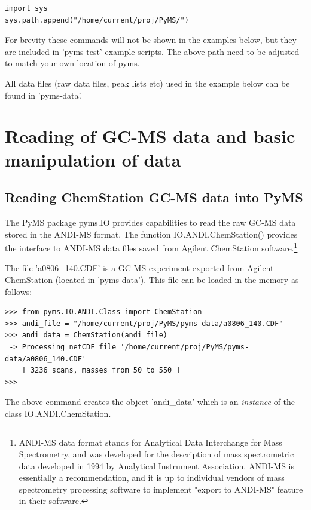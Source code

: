 \begin{verbatim}
import sys
sys.path.append("/home/current/proj/PyMS/")
\end{verbatim}

For brevity these commands will not be shown in the examples below, but
they are included in 'pyms-test' example scripts.  The above path need
to be adjusted to match your own location of pyms.

All data files (raw data files, peak lists etc) used in the example below
can be found in 'pyms-data'.


\section{Reading of GC-MS data and basic manipulation of data}

\subsection{Reading ChemStation GC-MS data into PyMS}


The PyMS package pyms.IO provides capabilities to read the raw GC-MS
data stored in the ANDI-MS format. The function IO.ANDI.ChemStation()
provides the interface to ANDI-MS data files saved from Agilent
ChemStation software.\footnote{ANDI-MS data format stands for Analytical
Data Interchange for Mass Spectrometry, and was developed for the
description of mass spectrometric data developed in 1994 by Analytical
Instrument Association. ANDI-MS is essentially a recommendation, and
it is up to individual vendors of mass spectrometry processing software
to implement "export to ANDI-MS" feature in their software.}

The file 'a0806\_140.CDF' is a GC-MS experiment exported from Agilent
ChemStation (located in 'pyms-data'). This file can be loaded in the
memory as follows:

\begin{verbatim}
>>> from pyms.IO.ANDI.Class import ChemStation
>>> andi_file = "/home/current/proj/PyMS/pyms-data/a0806_140.CDF"
>>> andi_data = ChemStation(andi_file)
 -> Processing netCDF file '/home/current/proj/PyMS/pyms-data/a0806_140.CDF'
    [ 3236 scans, masses from 50 to 550 ]
>>>
\end{verbatim}

\noindent
The above command creates the object 'andi\_data' which is an {\em instance}
of the class IO.ANDI.ChemStation.


